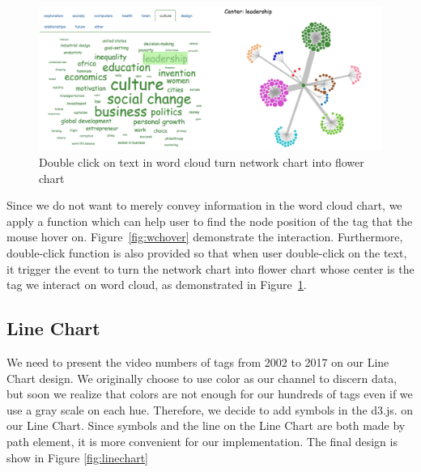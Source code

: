\documentclass{report}
\numberwithin{figure}{section}
\begin{document}
\begin{figure}
\begin{center}
\includegraphics[scale=0.4]{wcDLC}
\caption{Double click on text in word cloud turn network chart into flower chart}
\label{fig:wcDLC}
\end{center}
\end{figure}

\quad Since we do not want to merely convey information in the word cloud chart, we apply a function which can help user to find the node position of the tag that the mouse hover on. Figure~\ref{fig:wchover} demonstrate the interaction. Furthermore, double-click function is also provided so that when user double-click on the text, it trigger the event to turn the network chart into flower chart whose center is the tag we interact on word cloud, as demonstrated in Figure~\ref{fig:wcDLC}.

\subsection{Line Chart}
\quad  We need to present the video numbers of tags from 2002 to 2017 on our Line Chart design. We originally choose to use color as our channel to discern data, but soon we realize that colors are not enough for our hundreds of tags even if we use a gray scale on each hue. Therefore, we decide to add symbols\cite{d3.symbol} in the d3.js. on our Line Chart. Since symbols and the line on the Line Chart are both made by path element, it is more convenient for our implementation. The final design is show in Figure \ref{fig:linechart}
\end{document}

